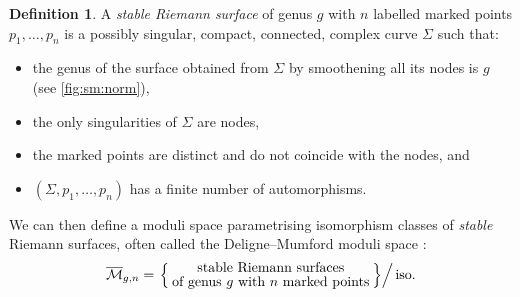 \documentclass[11pt,reqno]{amsart}
\numberwithin{equation}{section}
\newcommand{\mc}[1]{\mathcal{#1}}
\newcommand{\M}{\mc{M}}
\newcommand{\Mbar}{\overline{\M}}
\theoremstyle{plain}
\theoremstyle{definition}
\newtheorem{definition}[theorem]{Definition}
\begin{document}
\begin{definition}
  A \emph{stable Riemann surface} of genus $g$ with $n$ labelled marked points $p_1,\dots,p_n$ is a possibly singular, compact, connected, complex curve $\Sigma$ such that:
  \begin{itemize}
    \item the genus of the surface obtained from $\Sigma$ by smoothening all its nodes is $g$ (see \cref{fig:sm:norm}),

    \item the only singularities of $\Sigma$ are nodes,

    \item the marked points are distinct and do not coincide with the nodes, and
    
    \item $(\Sigma,p_1,\dots,p_n)$ has a finite number of automorphisms.
  \end{itemize}
  We can then define a moduli space parametrising isomorphism classes of \emph{stable} Riemann surfaces, often called the Deligne--Mumford moduli space \cite{DM69}:
  \begin{equation}
    \Mbar_{g,n}
    =
    \left.\Set{
      \substack{
        \displaystyle\text{stable Riemann surfaces} \\[.5ex]
        \displaystyle\text{of genus $g$ with $n$ marked points}
      }
    }
    \right/ \text{iso.}
  \end{equation}
\end{definition}
\end{document}

